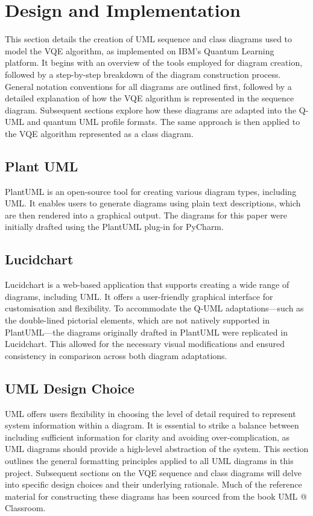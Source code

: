 \documentclass{article}
\begin{document}
\section{Design and Implementation}

This section details the creation of UML sequence and class diagrams used to model the VQE algorithm, as implemented on IBM's Quantum Learning platform. It begins with an overview of the tools employed for diagram creation, followed by a step-by-step breakdown of the diagram construction process. General notation conventions for all diagrams are outlined first, followed by a detailed explanation of how the VQE algorithm is represented in the sequence diagram. Subsequent sections explore how these diagrams are adapted into the Q-UML and quantum UML profile formats. The same approach is then applied to the VQE algorithm represented as a class diagram.

\subsection{Plant UML}

PlantUML is an open-source tool for creating various diagram types, including UML. It enables users to generate diagrams using plain text descriptions, which are then rendered into a graphical output\cite{PUML}\cite{PUMLWIKI}. The diagrams for this paper were initially drafted using the PlantUML plug-in for PyCharm.

\subsection{Lucidchart}

Lucidchart is a web-based application that supports creating a wide range of diagrams, including UML. It offers a user-friendly graphical interface for customisation and flexibility. To accommodate the Q-UML adaptations—such as the double-lined pictorial elements, which are not natively supported in PlantUML—the diagrams originally drafted in PlantUML were replicated in Lucidchart. This allowed for the necessary visual modifications and ensured consistency in comparison across both diagram adaptations.

\subsection{UML Design Choice}

UML offers users flexibility in choosing the level of detail required to represent system information within a diagram. It is essential to strike a balance between including sufficient information for clarity and avoiding over-complication, as UML diagrams should provide a high-level abstraction of the system. This section outlines the general formatting principles applied to all UML diagrams in this project. Subsequent sections on the VQE sequence and class diagrams will delve into specific design choices and their underlying rationale. Much of the reference material for constructing these diagrams has been sourced from the book UML @ Classroom\cite{Seidl_Scholz_Huemer_Kappel_Duffy_2014}. 
\end{document}
